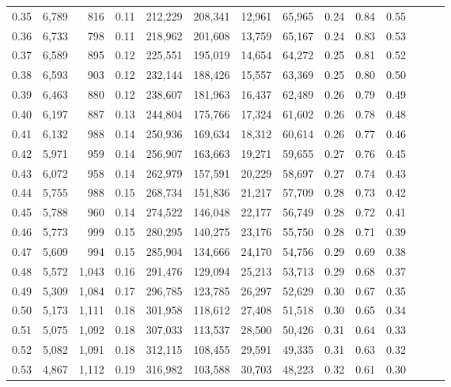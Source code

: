 \begin{tabular}{rrrrrrrrrrrrrr}
0.35 &  6,789 &    816 &  0.11 &  212,229 &  208,341 &  12,961 &  65,965 &  0.24 &  0.84 &      0.55 \\
0.36 &  6,733 &    798 &  0.11 &  218,962 &  201,608 &  13,759 &  65,167 &  0.24 &  0.83 &      0.53 \\
0.37 &  6,589 &    895 &  0.12 &  225,551 &  195,019 &  14,654 &  64,272 &  0.25 &  0.81 &      0.52 \\
0.38 &  6,593 &    903 &  0.12 &  232,144 &  188,426 &  15,557 &  63,369 &  0.25 &  0.80 &      0.50 \\
0.39 &  6,463 &    880 &  0.12 &  238,607 &  181,963 &  16,437 &  62,489 &  0.26 &  0.79 &      0.49 \\
0.40 &  6,197 &    887 &  0.13 &  244,804 &  175,766 &  17,324 &  61,602 &  0.26 &  0.78 &      0.48 \\
0.41 &  6,132 &    988 &  0.14 &  250,936 &  169,634 &  18,312 &  60,614 &  0.26 &  0.77 &      0.46 \\
0.42 &  5,971 &    959 &  0.14 &  256,907 &  163,663 &  19,271 &  59,655 &  0.27 &  0.76 &      0.45 \\
0.43 &  6,072 &    958 &  0.14 &  262,979 &  157,591 &  20,229 &  58,697 &  0.27 &  0.74 &      0.43 \\
0.44 &  5,755 &    988 &  0.15 &  268,734 &  151,836 &  21,217 &  57,709 &  0.28 &  0.73 &      0.42 \\
0.45 &  5,788 &    960 &  0.14 &  274,522 &  146,048 &  22,177 &  56,749 &  0.28 &  0.72 &      0.41 \\
0.46 &  5,773 &    999 &  0.15 &  280,295 &  140,275 &  23,176 &  55,750 &  0.28 &  0.71 &      0.39 \\
0.47 &  5,609 &    994 &  0.15 &  285,904 &  134,666 &  24,170 &  54,756 &  0.29 &  0.69 &      0.38 \\
0.48 &  5,572 &  1,043 &  0.16 &  291,476 &  129,094 &  25,213 &  53,713 &  0.29 &  0.68 &      0.37 \\
0.49 &  5,309 &  1,084 &  0.17 &  296,785 &  123,785 &  26,297 &  52,629 &  0.30 &  0.67 &      0.35 \\
0.50 &  5,173 &  1,111 &  0.18 &  301,958 &  118,612 &  27,408 &  51,518 &  0.30 &  0.65 &      0.34 \\
0.51 &  5,075 &  1,092 &  0.18 &  307,033 &  113,537 &  28,500 &  50,426 &  0.31 &  0.64 &      0.33 \\
0.52 &  5,082 &  1,091 &  0.18 &  312,115 &  108,455 &  29,591 &  49,335 &  0.31 &  0.63 &      0.32 \\
0.53 &  4,867 &  1,112 &  0.19 &  316,982 &  103,588 &  30,703 &  48,223 &  0.32 &  0.61 &      0.30 \\

\end{tabular}
